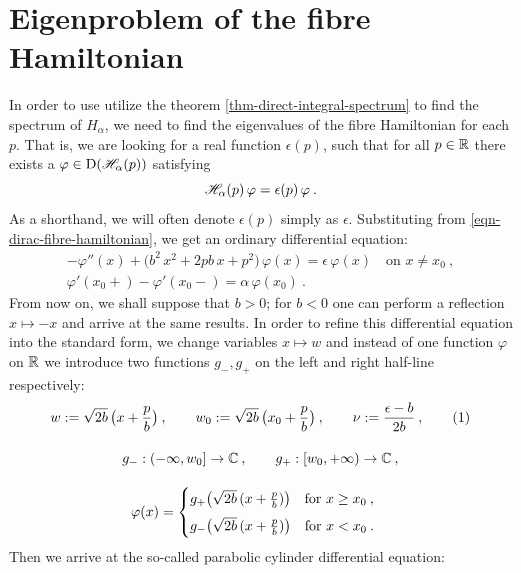 \section{Eigenproblem of the fibre Hamiltonian} \label{section-dirac-eigenproblem}
In order to use utilize the theorem \ref{thm-direct-integral-spectrum} to find the spectrum of $H_\alpha$, we need to find the eigenvalues of the fibre Hamiltonian for each $p$. That is, we are looking for a real function $\epsilon(p)$, such that for all $p \in \mathbb{R}$ there exists a $\varphi \in \mathrm{D}(\mathscr{H}_\alpha(p))$ satisfying
\begin{equation*}
    \mathscr{H}_\alpha(p) \, \varphi = \epsilon(p) \, \varphi \: .
\end{equation*}
As a shorthand, we will often denote $\epsilon(p)$ simply as $\epsilon$. Substituting from \eqref{eqn-dirac-fibre-hamiltonian}, we get an ordinary differential equation:
\begin{gather*}
    -\varphi''(x)
    + \big( b^2 \, x^2 + 2 p b \, x + p^2 \big) \, \varphi(x)
    = \epsilon \, \varphi(x)
    \quad \text{on } x \neq x_0 \: ,
    \\
    \varphi'(x_0+) - \varphi'(x_0-) = \alpha \, \varphi(x_0)
    \: .
\end{gather*}
From now on, we shall suppose that $b>0$; for $b<0$ one can perform a reflection $x \mapsto -x$ and arrive at the same results. In order to refine this differential equation into the standard form, we change variables $x\mapsto w$ and instead of one function $\varphi$ on $\mathbb{R}$ we introduce two functions $g_-, g_+$ on the left and right half-line respectively:
\begin{gather*}
    w \coloneqq \sqrt{2b} \, \big( x + \frac{p}{b} \big) \: ,
    \qquad
    w_0 \coloneqq \sqrt{2b}\,\big( x_0 + \frac{p}{b} \big) \: ,
    \qquad
    \nu \coloneqq \frac{\epsilon - b}{2b} \: ,
    \numberthis
    \label{eqn-w-nu-definition}
    \\[10pt]
    g_-: (-\infty, w_0] \to \C \: , \qquad
    g_+: [w_0, +\infty) \to \C \: ,
    \\[10pt]
    \varphi(x) = \begin{cases}
        g_+ \big( \sqrt{2b} \, (x + \frac{p}{b}) \big)
        \quad \text{for } x \geq x_0 \: ,
        \\[5pt]
        g_- \big( \sqrt{2b} \, (x + \frac{p}{b}) \big)
        \quad \text{for } x < x_0 \: .
    \end{cases}
\end{gather*}
Then we arrive at the so-called parabolic cylinder differential equation:
